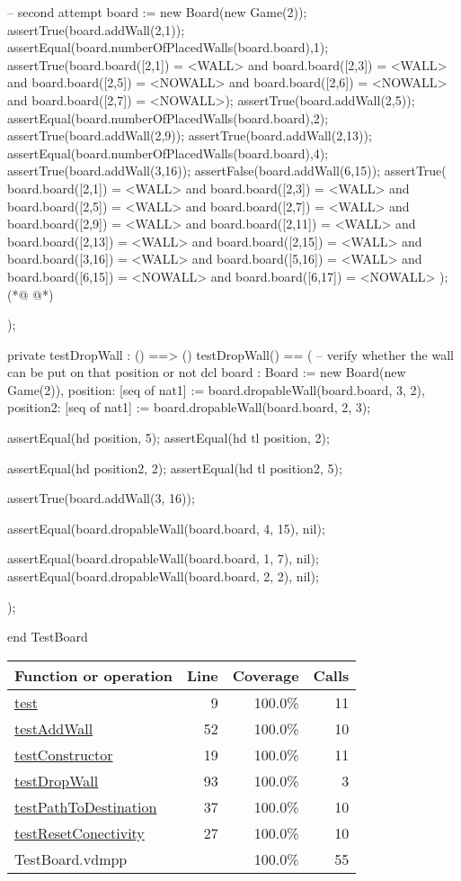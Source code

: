 \begin{vdmpp}[breaklines=true]
  -- second attempt
  board := new Board(new Game(2));
  assertTrue(board.addWall(2,1));
  assertEqual(board.numberOfPlacedWalls(board.board),1);
  assertTrue(board.board([2,1]) = <WALL> and board.board([2,3]) = <WALL> and board.board([2,5]) = <NOWALL> and board.board([2,6]) = <NOWALL> and board.board([2,7]) = <NOWALL>);
  assertTrue(board.addWall(2,5));
  assertEqual(board.numberOfPlacedWalls(board.board),2);
  assertTrue(board.addWall(2,9));
  assertTrue(board.addWall(2,13));
  assertEqual(board.numberOfPlacedWalls(board.board),4);
  assertTrue(board.addWall(3,16));
  assertFalse(board.addWall(6,15));
  assertTrue(
   board.board([2,1]) = <WALL> and board.board([2,3]) = <WALL> and board.board([2,5]) = <WALL> and
   board.board([2,7]) = <WALL> and board.board([2,9]) = <WALL> and board.board([2,11]) = <WALL> and
   board.board([2,13]) = <WALL> and board.board([2,15]) = <WALL> and board.board([3,16]) = <WALL> and   
   board.board([5,16]) = <WALL> and board.board([6,15]) = <NOWALL> and board.board([6,17]) = <NOWALL>   
  );
(*@
\label{testDropWall:93}
@*)
  
 );
 
 private testDropWall : () ==> ()
 testDropWall() ==
 (
  -- verify whether the wall can be put on that position or not
  dcl 
  board : Board := new Board(new Game(2)),
  position: [seq of nat1] := board.dropableWall(board.board, 3, 2),
  position2: [seq of nat1] := board.dropableWall(board.board, 2, 3);
  
  assertEqual(hd position, 5);
  assertEqual(hd tl position, 2);
  
  assertEqual(hd position2, 2);
  assertEqual(hd tl position2, 5);
  
  assertTrue(board.addWall(3, 16));
  
  assertEqual(board.dropableWall(board.board, 4, 15), nil);
  
  assertEqual(board.dropableWall(board.board, 1, 7), nil);
  assertEqual(board.dropableWall(board.board, 2, 2), nil);
    
 );
 
end TestBoard
\end{vdmpp}
\bigskip
\begin{longtable}{|l|r|r|r|}
\hline
Function or operation & Line & Coverage & Calls \\
\hline
\hline
\hyperref[test:9]{test} & 9&100.0\% & 11 \\
\hline
\hyperref[testAddWall:52]{testAddWall} & 52&100.0\% & 10 \\
\hline
\hyperref[testConstructor:19]{testConstructor} & 19&100.0\% & 11 \\
\hline
\hyperref[testDropWall:93]{testDropWall} & 93&100.0\% & 3 \\
\hline
\hyperref[testPathToDestination:37]{testPathToDestination} & 37&100.0\% & 10 \\
\hline
\hyperref[testResetConectivity:27]{testResetConectivity} & 27&100.0\% & 10 \\
\hline
\hline
TestBoard.vdmpp & & 100.0\% & 55 \\
\hline
\end{longtable}

